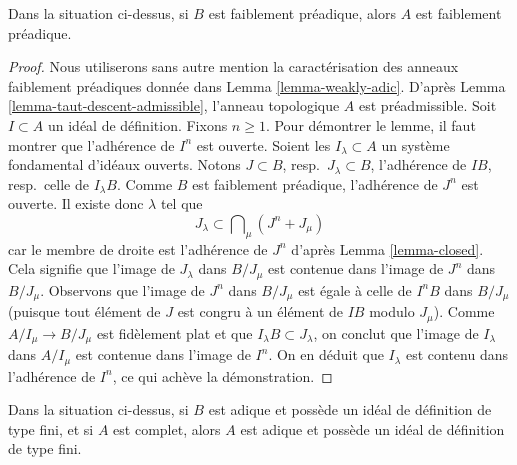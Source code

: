 \begin{lemma}
\label{lemma-taut-descent-weakly-adic}
Dans la situation ci-dessus, si $B$ est faiblement préadique, alors $A$
est faiblement préadique.
\end{lemma}

\begin{proof}
Nous utiliserons sans autre mention la caractérisation des anneaux faiblement préadiques donnée dans
Lemma \ref{lemma-weakly-adic}.
D'après Lemma \ref{lemma-taut-descent-admissible},
l'anneau topologique $A$ est préadmissible.
Soit $I \subset A$ un idéal de définition.
Fixons $n \geq 1$. Pour démontrer le lemme, il faut
montrer que l'adhérence de $I^n$ est ouverte.
Soient les $I_\lambda \subset A$ un système fondamental d'idéaux ouverts.
Notons $J \subset B$, resp.\ $J_\lambda \subset B$,
l'adhérence de $IB$, resp.\ celle de $I_\lambda B$.
Comme $B$ est faiblement préadique, l'adhérence de $J^n$ est ouverte.
Il existe donc $\lambda$ tel que
$$
J_\lambda \subset \bigcap\nolimits_\mu (J^n + J_\mu)
$$
car le membre de droite est l'adhérence de $J^n$ d'après
Lemma \ref{lemma-closed}.
Cela signifie que l'image de $J_\lambda$ dans $B/J_\mu$ est contenue dans
l'image de $J^n$ dans $B/J_\mu$. Observons que l'image de $J^n$ dans
$B/J_\mu$ est égale à celle de $I^nB$ dans $B/J_\mu$ (puisque tout élément
de $J$ est congru à un élément de $IB$ modulo $J_\mu$).
Comme $A/I_\mu \to B/J_\mu$ est fidèlement plat et que
$I_\lambda B \subset J_\lambda$,
on conclut que l'image de $I_\lambda$ dans $A/I_\mu$
est contenue dans l'image de $I^n$.
On en déduit que $I_\lambda$ est contenu dans l'adhérence
de $I^n$, ce qui achève la démonstration.
\end{proof}

\begin{lemma}
\label{lemma-taut-descent-adic-star}
Dans la situation ci-dessus, si $B$ est adique et possède un idéal de définition
de type fini, et si $A$ est complet, alors $A$ est adique et
possède un idéal de définition de type fini.
\end{lemma}

